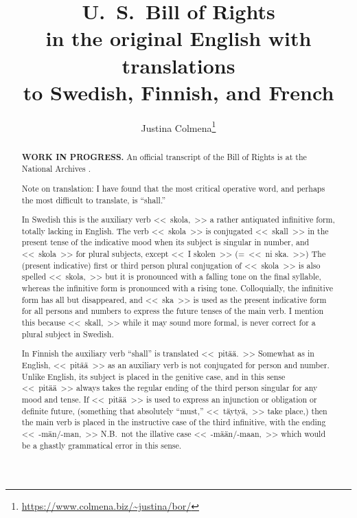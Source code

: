\documentclass[a4paper,landscape,10pt]{article}
\title{{\huge \textbf{U.~S.\ Bill of Rights}}\\
	in the original English with translations\\
	to Swedish, Finnish, and French}
\author{Justina Colmena\footnote{\url{https://www.colmena.biz/~justina/bor/}}}
\begin{document}
	
\sloppy
\maketitle
\begin{abstract}
	{\color{red}\textbf{WORK IN PROGRESS.}} An official transcript of the Bill of Rights is at the National Archives \cite{national-archives}.
	
	Note on translation:  I have found that the most critical operative word, and perhaps the most difficult to translate, is ``shall.''
	
	In Swedish this is the auxiliary verb \foreignlanguage{swedish}{<<~skola,~>>} a rather antiquated infinitive form, totally lacking in English.  The verb \foreignlanguage{swedish}{<<~skola~>>} is conjugated \foreignlanguage{swedish}{<<~skall~>>} in the present tense of the indicative mood when its subject is singular in number, and \foreignlanguage{swedish}{<<~skola~>>} for plural subjects, except \foreignlanguage{swedish}{<<~I skolen~>> (=~<<~ni ska.~>>)}  The (present indicative) first or third person plural conjugation of \foreignlanguage{swedish}{<<~skola~>>} is also spelled \foreignlanguage{swedish}{<<~skola,~>>} but it is pronounced with a falling tone on the final syllable, whereas the infinitive form is pronounced with a rising tone.  Colloquially, the infinitive form has all but disappeared, and \foreignlanguage{swedish}{<<~ska~>>} is used as the present indicative form for all persons and numbers to express the future tenses of the main verb.  I mention this because \foreignlanguage{swedish}{<<~skall,~>>} while it may sound more formal, is never correct for a plural subject in Swedish.
		
	In Finnish the auxiliary verb ``shall'' is translated \foreignlanguage{finnish}{<<~pitää.~>>}  Somewhat as in English, \foreignlanguage{finnish}{<<~pitää~>>} as an auxiliary verb is not conjugated for person and number.  Unlike English, its subject is placed in the genitive case, and in this sense \foreignlanguage{finnish}{<<~pitää~>>}  always takes the regular ending of the third person singular for any mood and tense.  If \foreignlanguage{finnish}{<<~pitää~>>} is used to express an injunction or obligation or definite future, (something that absolutely ``must,'' \foreignlanguage{finnish}{<<~täytyä,~>>} take place,) then the main verb is placed in the instructive case of the third infinitive, with the ending \foreignlanguage{finnish}{<<~\mbox{-män/-man,}~>>} N.B.\ not the illative case \foreignlanguage{finnish}{<<~\mbox{-mään/-maan,}~>>} which would be a ghastly grammatical error in this sense.


\end{abstract}
\end{document}
